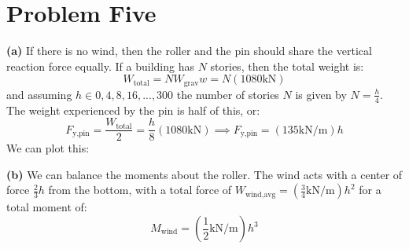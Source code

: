 \documentclass{article}
\begin{document}
\section{Problem Five}
\textbf{(a)} If there is no wind, then the roller and the pin should share the vertical reaction force equally. If a building has $N$ stories, then the total weight is:
\begin{equation}
    W_\text{total}=NW_\text{grav}w=N(1080\si{\kilo\newton})
    \label{eq:}
\end{equation}
and assuming $h \in {0,4,8,16,...,300}$ the number of stories $N$ is given by $N=\frac{h}{4}$. The weight experienced by the pin is half of this, or:
\begin{equation}
    F_\text{y,pin} = \frac{W_\text{total}}{2} = \frac{h}{8}(1080\si{\kilo\newton}) \implies \boxed{F_\text{y,pin} = (135\si{\kilo\newton\per\meter})h}
    \label{eq:}
\end{equation}
We can plot this:
\begin{center}
\end{center}
\textbf{(b)} We can balance the moments about the roller. The wind acts with a center of force $\frac{2}{3}h$ from the bottom, with a total force of $W_\text{wind,avg}=(\frac{3}{4}\si{\kilo\newton\per\meter})h^2$ for a total moment of:
\begin{equation}
    M_\text{wind} = \left(\frac{1}{2}\si{\kilo\newton\per\meter}\right)h^3
    \label{eq:}
\end{equation}
\end{document}
